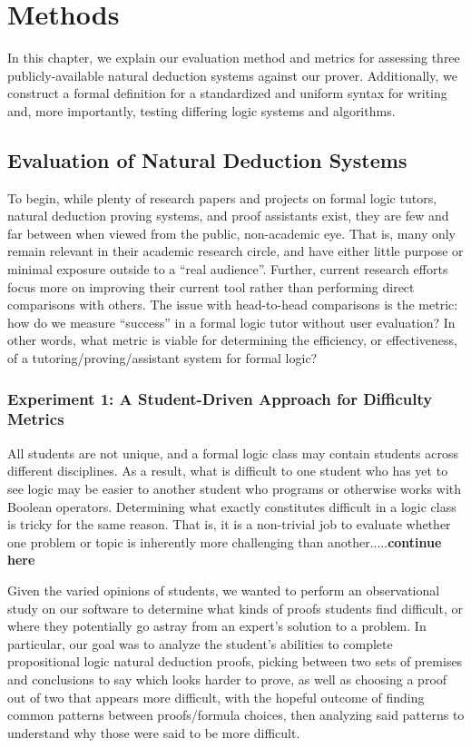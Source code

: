 \documentclass[ms]{uncgdissertationexp2}
\theoremstyle{plain}
\theoremstyle{definition}
\theoremstyle{remark}
\begin{document}
\chapter{Methods}\label{chapter:3}
In this chapter, we explain our evaluation method and metrics for assessing three publicly-available natural deduction systems against our prover. Additionally, we construct a formal definition for a standardized and uniform syntax for writing and, more importantly, testing differing logic systems and algorithms.

\section{Evaluation of Natural Deduction Systems}
To begin, while plenty of research papers and projects on formal logic tutors, natural deduction proving systems, and proof assistants exist, they are few and far between when viewed from the public, non-academic eye. That is, many only remain relevant in their academic research circle, and have either little purpose or minimal exposure outside to a ``real audience''. Further, current research efforts focus more on improving their current tool rather than performing direct comparisons with others. The issue with head-to-head comparisons is the metric: how do we measure ``success'' in a formal logic tutor without user evaluation? In other words, what metric is viable for determining the efficiency, or effectiveness, of a tutoring/proving/assistant system for formal logic?

\subsection{Experiment 1: A Student-Driven Approach for Difficulty Metrics}
All students are not unique, and a formal logic class may contain students across different disciplines. As a result, what is difficult to one student who has yet to see logic may be easier to another student who programs or otherwise works with Boolean operators. Determining what exactly constitutes difficult in a logic class is tricky for the same reason. That is, it is a non-trivial job to evaluate whether one problem or topic is inherently more challenging than another.....\textbf{continue here}

Given the varied opinions of students, we wanted to perform an observational study on our software to determine what kinds of proofs students find difficult, or where they potentially go astray from an expert's solution to a problem. In particular, our goal was to analyze the student's abilities to complete propositional logic natural deduction proofs, picking between two sets of premises and conclusions to say which looks harder to prove, as well as choosing a proof out of two that appears more difficult, with the hopeful outcome of finding common patterns between proofs/formula choices, then analyzing said patterns to understand why those were said to be more difficult.
\end{document}
